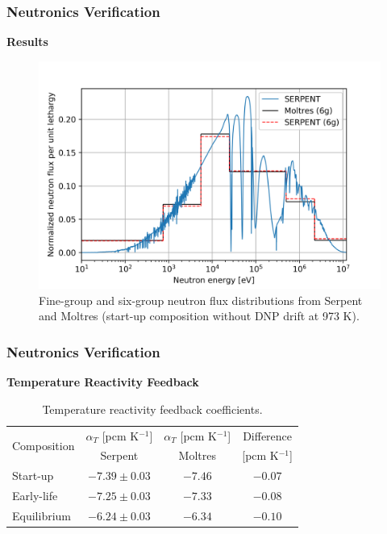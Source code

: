 \begin{frame}
	\frametitle{Neutronics Verification}
		\textbf{Results}
			\begin{figure}
				\centering
				\includegraphics[width=.8\textwidth]{../paper/figures/nt-spec}
				\caption{Fine-group and six-group neutron flux distributions
				from Serpent and Moltres (start-up composition without \gls{DNP}
				drift at 973 K).}
				\label{fig:ntspec}
			\end{figure}
\end{frame}

\begin{frame}
	\frametitle{Neutronics Verification}
		\textbf{Temperature Reactivity Feedback}
			\begin{table}[t]
				\centering
				\caption{Temperature reactivity feedback coefficients.}
				\begin{tabular}{lccc}
					\hline
					\multirow{2}{*}{Composition} & {$\alpha_T$ [pcm K$^{-1}$]} & {$\alpha_T$ [pcm K$^{-1}$]} & Difference\\
					& Serpent & Moltres & [pcm K$^{-1}$]\\
					\hline
					Start-up & $-7.39 \pm 0.03$ & $-7.46$ & $-0.07$\\
					Early-life & $-7.25 \pm 0.03$ & $-7.33$ & $-0.08$\\
					Equilibrium & $-6.24 \pm 0.03$ & $-6.34$ & $-0.10$\\
					\hline
				\end{tabular}
				\label{table:reactivity}
			\end{table}	
\end{frame}
